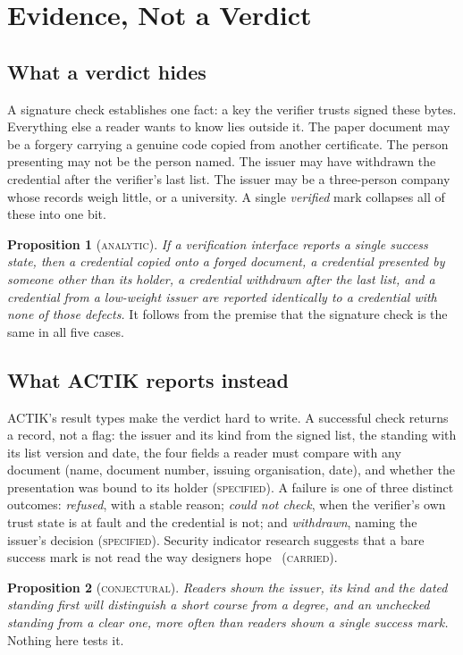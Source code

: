 \documentclass[10pt,a4paper,twocolumn]{article}
\newcommand{\kind}[1]{\textsc{#1}}
\begin{document}
\section{Evidence, Not a Verdict}
\label{sec:verdict}

\subsection{What a verdict hides}

A signature check establishes one fact: a key the verifier trusts signed these
bytes. Everything else a reader wants to know lies outside it. The paper document
may be a forgery carrying a genuine code copied from another certificate. The
person presenting may not be the person named. The issuer may have withdrawn the
credential after the verifier's last list. The issuer may be a three-person
company whose records weigh little, or a university. A single \emph{verified}
mark collapses all of these into one bit.

\textbf{Proposition 1} (\kind{analytic}). \emph{If a verification interface
reports a single success state, then a credential copied onto a forged document,
a credential presented by someone other than its holder, a credential withdrawn
after the last list, and a credential from a low-weight issuer are reported
identically to a credential with none of those defects.} It follows from the
premise that the signature check is the same in all five cases.

\subsection{What ACTIK reports instead}

ACTIK's result types make the verdict hard to write. A successful check returns a
record, not a flag: the issuer and its kind from the signed list, the standing
with its list version and date, the four fields a reader must compare with any
document (name, document number, issuing organisation, date), and whether the
presentation was bound to its holder (\kind{specified}). A failure is one of three
distinct outcomes: \emph{refused}, with a stable reason; \emph{could not check},
when the verifier's own trust state is at fault and the credential is not; and
\emph{withdrawn}, naming the issuer's decision (\kind{specified}). Security
indicator research suggests that a bare success mark is not read the way
designers hope~\citep{schechter2007emperor} (\kind{carried}).

\textbf{Proposition 2} (\kind{conjectural}). \emph{Readers shown the issuer,
its kind and the dated standing first will distinguish a short course from a
degree, and an unchecked standing from a clear one, more often than readers shown
a single success mark.} Nothing here tests it.
\end{document}
